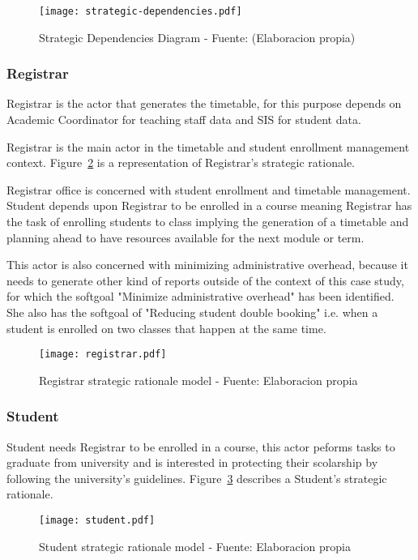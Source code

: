 \begin{figure}
	\caption{Strategic Dependencies Diagram - Fuente: (Elaboracion propia)}\label{fig:strategicDependenciesDiagram}
	\centering
	\texttt{[image: strategic-dependencies.pdf]}
\end{figure}

\subsubsection{Registrar}
Registrar is the actor that generates the timetable, for this purpose depends on Academic Coordinator for teaching staff data and SIS for student data.

Registrar is the main actor in the timetable and student enrollment management context.
Figure~\ref{fig:actorBoundaryRegistrar} is a representation of Registrar's strategic rationale.

Registrar office is concerned with student enrollment and timetable management.
Student depends upon Registrar to be enrolled in a course meaning Registrar has the task of enrolling students to class implying the generation of a timetable and planning ahead to have resources available for the next module or term.

This actor is also concerned with minimizing administrative overhead, because it needs to generate other kind of reports outside of the context of this case study, for which the softgoal "Minimize administrative overhead" has been identified.
She also has the softgoal of "Reducing student double booking" i.e. when a student is enrolled on two classes that happen at the same time.

\begin{landscape}
	\begin{figure}
		\centering
		\caption{Registrar strategic rationale model - Fuente: Elaboracion propia}
		\texttt{[image: registrar.pdf]}
		\label{fig:actorBoundaryRegistrar}
	\end{figure}
\end{landscape}

\subsubsection{Student}
Student needs Registrar to be enrolled in a course, this actor peforms tasks to graduate from university and is interested in protecting their scolarship by following the university's guidelines.
Figure~\ref{fig:actorBoundaryStudent} describes a Student's strategic rationale.
\begin{figure}
	\centering
	\caption{Student strategic rationale model - Fuente: Elaboracion propia}
	\texttt{[image: student.pdf]}
	\label{fig:actorBoundaryStudent}
\end{figure}

